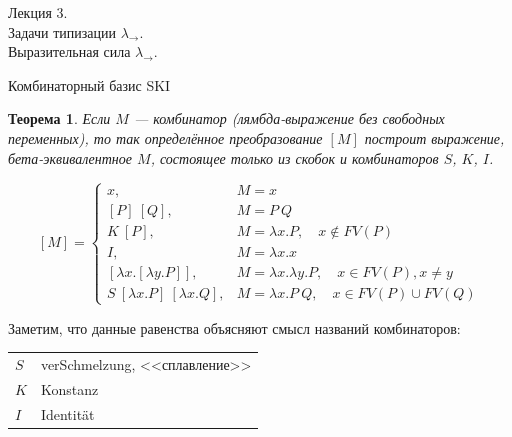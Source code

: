 \documentclass[aspectratio=169]{beamer}
\begin{document}
\newtheorem{dfn}{Определение}[section]
\newtheorem{nte}{Замечание}[section]

\newtheorem{axiom}{Аксиома}[section]
\newtheorem{thm}{Теорема}[section]
\newtheorem{lmm}[theorem]{Лемма}
\newtheorem{statement}{Утверждение}[section]
\newtheorem{oun_paragraph}{Пункт}[section]
\newtheorem{cons}{Следствие}[section]
\newtheorem*{exm}{Пример}

\newcommand{\comb}[1]{\operatorname{\bf{\textrm{#1}}}}
\newcommand{\func}[1]{\operatorname{#1}}
\newcommand{\reduction}[1]{{\color{OrangeRed}#1}}
\newcommand{\set}[1]{\left\{#1\right\}}

\def\from#1{\par \parbox{0.7\textwidth}{\par \hfill\raggedleft \it #1}} 

\begin{frame}{}
\begin{center}\Large Лекция 3.\\ \Large Задачи типизации $\lambda_\rightarrow$. \\Выразительная сила $\lambda_\rightarrow$.\end{center}
\end{frame}

\begin{frame}{Комбинаторный базис SKI}
\begin{thm}Если $M$ --- комбинатор (лямбда-выражение без свободных переменных),
то так определённое преобразование $[M]$ построит выражение, бета-эквивалентное
$M$, состоящее только из скобок и комбинаторов $S$, $K$, $I$.

$$[M]=\left\{\begin{array}{ll}
x, & M = x\\
\left[P\right]\ [Q], & M = P\ Q\\
K\ [P], & M = \lambda x.P,\quad x \notin FV(P)\\
I, & M = \lambda x.x \\
\left[\lambda x.\left[\lambda y.P\right]\right], & M = \lambda x.\lambda y.P,\quad x \in FV(P), x \ne y\\
S\ [\lambda x.P]\ [\lambda x.Q], & M = \lambda x.P\ Q,\quad x \in FV(P)\cup FV(Q)
\end{array}\right.$$
\end{thm}

Заметим, что данные равенства объясняют смысл названий комбинаторов:

\begin{tabular}{ll}
$S$ & verSchmelzung, <<сплавление>> \\
$K$ & Konstanz \\
$I$ & Identit\"at
\end{tabular}
\end{frame}
\end{document}
